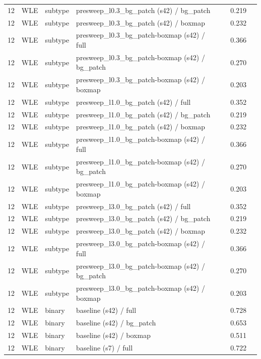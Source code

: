 \begin{longtable}{cL{1.1cm}L{1.5cm}L{5.6cm}ccc}
12 & WLE & subtype & presweep\_l0.3\_bg\_patch (s42) / bg\_patch & \nl{} & 0.219 & \nl{} \\
12 & WLE & subtype & presweep\_l0.3\_bg\_patch (s42) / boxmap & \nl{} & 0.232 & \nl{} \\
12 & WLE & subtype & presweep\_l0.3\_bg\_patch-boxmap (s42) / full & \nl{} & 0.366 & \nl{} \\
12 & WLE & subtype & presweep\_l0.3\_bg\_patch-boxmap (s42) / bg\_patch & \nl{} & 0.270 & \nl{} \\
12 & WLE & subtype & presweep\_l0.3\_bg\_patch-boxmap (s42) / boxmap & \nl{} & 0.203 & \nl{} \\
12 & WLE & subtype & presweep\_l1.0\_bg\_patch (s42) / full & \nl{} & 0.352 & \nl{} \\
12 & WLE & subtype & presweep\_l1.0\_bg\_patch (s42) / bg\_patch & \nl{} & 0.219 & \nl{} \\
12 & WLE & subtype & presweep\_l1.0\_bg\_patch (s42) / boxmap & \nl{} & 0.232 & \nl{} \\
12 & WLE & subtype & presweep\_l1.0\_bg\_patch-boxmap (s42) / full & \nl{} & 0.366 & \nl{} \\
12 & WLE & subtype & presweep\_l1.0\_bg\_patch-boxmap (s42) / bg\_patch & \nl{} & 0.270 & \nl{} \\
12 & WLE & subtype & presweep\_l1.0\_bg\_patch-boxmap (s42) / boxmap & \nl{} & 0.203 & \nl{} \\
12 & WLE & subtype & presweep\_l3.0\_bg\_patch (s42) / full & \nl{} & 0.352 & \nl{} \\
12 & WLE & subtype & presweep\_l3.0\_bg\_patch (s42) / bg\_patch & \nl{} & 0.219 & \nl{} \\
12 & WLE & subtype & presweep\_l3.0\_bg\_patch (s42) / boxmap & \nl{} & 0.232 & \nl{} \\
12 & WLE & subtype & presweep\_l3.0\_bg\_patch-boxmap (s42) / full & \nl{} & 0.366 & \nl{} \\
12 & WLE & subtype & presweep\_l3.0\_bg\_patch-boxmap (s42) / bg\_patch & \nl{} & 0.270 & \nl{} \\
12 & WLE & subtype & presweep\_l3.0\_bg\_patch-boxmap (s42) / boxmap & \nl{} & 0.203 & \nl{} \\
12 & WLE & binary & baseline (s42) / full & \nl{} & 0.728 & \nl{} \\
12 & WLE & binary & baseline (s42) / bg\_patch & \nl{} & 0.653 & \nl{} \\
12 & WLE & binary & baseline (s42) / boxmap & \nl{} & 0.511 & \nl{} \\
12 & WLE & binary & baseline (s7) / full & \nl{} & 0.722 & \nl{} \\

\end{longtable}
